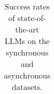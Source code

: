 \begin{table}[!h]
\begin{tabular}{llllllll}
        \bottomrule
    \end{tabular}
    \caption{Success rates of state-of-the-art LLMs on the synchronous and asynchronous datasets.}
    \label{tab:successes}
\end{table}